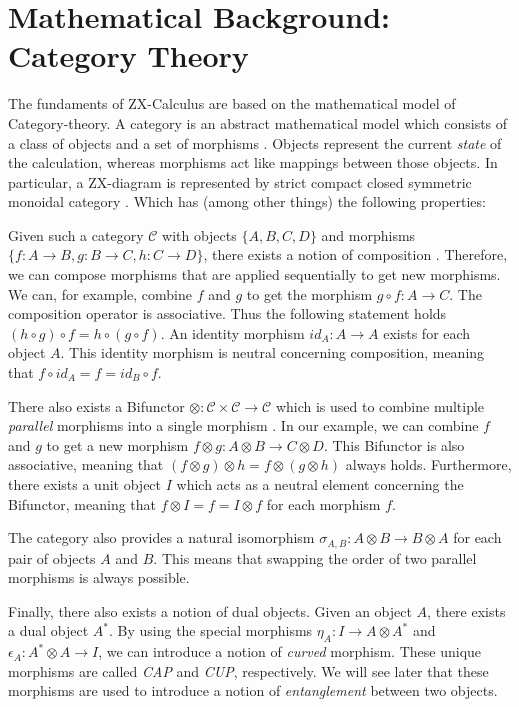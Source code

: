 \section{Mathematical Background: Category Theory}

The fundaments of ZX-Calculus are based on the mathematical model of Category-theory. A category is an abstract mathematical model which consists of a class of objects and a set of morphisms \cite{quanlong2023completness}. Objects represent the current \textit{state} of the calculation, whereas morphisms act like mappings between those objects. In particular, a ZX-diagram is represented by strict compact closed symmetric monoidal category \cite{emmanueljeandel2020zx}. Which has (among other things) the following properties:

Given such a category $\mathcal{C}$ with objects $\{A, B, C, D\}$ and morphisms $\{f: A \rightarrow B, g: B \rightarrow C, h: C \rightarrow D\}$, there exists a notion of composition \label{sequential-composition}. Therefore, we can compose morphisms that are applied sequentially to get new morphisms. We can, for example, combine $f$ and $g$ to get the morphism $g \circ f: A \rightarrow C$. The composition operator is associative. Thus the following statement holds $(h \circ g) \circ f = h \circ (g \circ f)$. An identity morphism $id_A: A \rightarrow A$ exists for each object $A$. This identity morphism is neutral concerning composition, meaning that $f \circ id_A = f = id_B \circ f$.

There also exists a Bifunctor $\otimes:\mathcal{C}\times\mathcal{C}\rightarrow\mathcal{C}$ which is used to combine multiple \textit{parallel} morphisms into a single morphism \label{parallel-composition}. In our example, we can combine $f$ and $g$ to get a new morphism $f \otimes g: A \otimes B \rightarrow C \otimes D$. This Bifunctor is also associative, meaning that $(f \otimes g) \otimes h = f \otimes (g \otimes h)$ always holds. Furthermore, there exists a unit object $I$ which acts as a neutral element concerning the Bifunctor, meaning that $f \otimes I = f = I \otimes f$ for each morphism $f$.

The category also provides a natural isomorphism $\sigma_{A, B}: A \otimes B \rightarrow B \otimes A$ for each pair of objects $A$ and $B$. This means that swapping the order of two parallel morphisms is always possible.

Finally, there also exists a notion of dual objects. Given an object $A$, there exists a dual object $A^*$. By using the special morphisms $\eta_A: I \rightarrow A \otimes A^*$ and $\epsilon_A: A^* \otimes A \rightarrow I$, we can introduce a notion of \textit{curved} morphism. These unique morphisms are called \textit{CAP} and \textit{CUP}, respectively. We will see later that these morphisms are used to introduce a notion of \textit{entanglement} between two objects.

